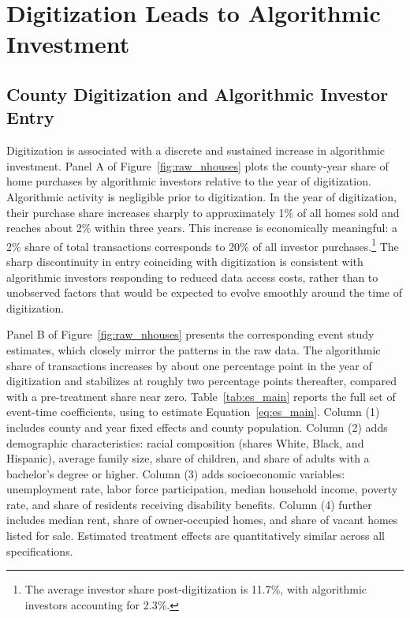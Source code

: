 \documentclass[11pt]{article}
\begin{document}
\section{Digitization Leads to Algorithmic Investment}

\subsection{County Digitization and Algorithmic Investor Entry}
Digitization is associated with a discrete and sustained increase in algorithmic investment. Panel A of Figure~\ref{fig:raw_nhouses} plots the county-year share of home purchases by algorithmic investors relative to the year of digitization. Algorithmic activity is negligible prior to digitization. In the year of digitization, their purchase share increases sharply to approximately 1\% of all homes sold and reaches about 2\% within three years. This increase is economically meaningful: a 2\% share of total transactions corresponds to 20\% of all investor purchases.\footnote{The average investor share post-digitization is 11.7\%, with algorithmic investors accounting for 2.3\%.} The sharp discontinuity in entry coinciding with digitization is consistent with algorithmic investors responding to reduced data access costs, rather than to unobserved factors that would be expected to evolve smoothly around the time of digitization.

Panel B of Figure~\ref{fig:raw_nhouses} presents the corresponding event study estimates, which closely mirror the patterns in the raw data. The algorithmic share of transactions increases by about one percentage point in the year of digitization and stabilizes at roughly two percentage points thereafter, compared with a pre-treatment share near zero. Table~\ref{tab:es_main} reports the full set of event-time coefficients, using \citet{dechaisemartin2024} to estimate Equation~\ref{eq:es_main}. Column (1) includes county and year fixed effects and county population. Column (2) adds demographic characteristics: racial composition (shares White, Black, and Hispanic), average family size, share of children, and share of adults with a bachelor’s degree or higher. Column (3) adds socioeconomic variables: unemployment rate, labor force participation, median household income, poverty rate, and share of residents receiving disability benefits. Column (4) further includes median rent, share of owner-occupied homes, and share of vacant homes listed for sale. Estimated treatment effects are quantitatively similar across all specifications.
\end{document}
